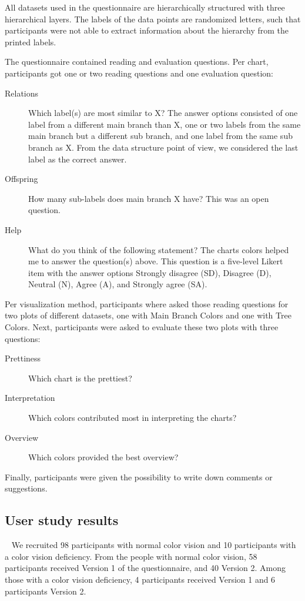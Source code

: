 \documentclass[journal]{vgtc}                %
\begin{document}
All datasets used in the questionnaire are hierarchically structured with three hierarchical layers. The 
labels of the data points are randomized letters, such that participants were not able to extract information 
about the hierarchy from the printed labels.

The questionnaire contained reading and evaluation questions. Per chart, participants got one or two reading questions and one evaluation question:
\begin{description}
\item[Relations] Which label(s) are most similar to X? The answer options consisted of one label from a different main branch than X, one or two labels from the same main branch but a different sub branch, and one label from the same sub branch as X. From the data structure point of view, we considered the last label as the correct answer.
\item[Offspring] How many sub-labels does main branch X have? This was an open question.
\item[Help] What do you think of the following statement? The charts colors helped me to answer the question(s) above. This question is a five-level Likert item with the answer options Strongly disagree (SD), Disagree (D), Neutral (N), Agree (A), and Strongly agree (SA).
\end{description}
Per visualization method, participants where asked those reading questions for two plots of different datasets, one with Main Branch Colors and one with Tree Colors. 
Next, participants were asked to evaluate these two plots with three questions:
\begin{description}
\item[Prettiness] Which chart is the prettiest?
\item[Interpretation] Which colors contributed most in interpreting the charts?
\item[Overview] Which colors provided the best overview?
\end{description}
Finally, participants were given the possibility to write down comments or suggestions.

\subsection{User study results}~\label{secuserres}
We recruited 98 participants with normal color vision and 10 participants with a color vision deficiency. From the people with normal color vision, 58 participants received Version 1 of the questionnaire, and 40 Version 2. Among those with a color vision deficiency, 4 participants received Version 1 and 6 participants Version 2.
\end{document}
